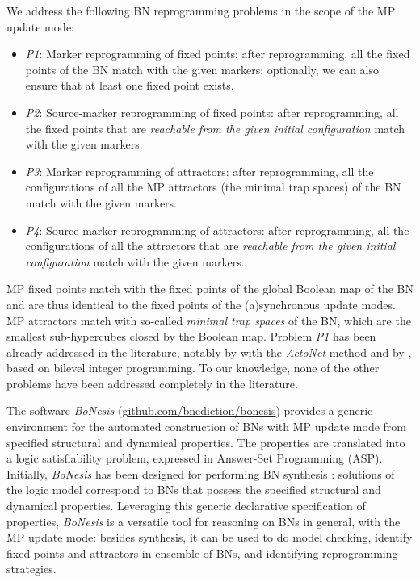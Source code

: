 \documentclass[PCJ,Unicode,screen,mode=plain]{cedram}
\begin{document}
We address the following BN reprogramming problems in the scope of the
MP update mode:

\begin{itemize}
\item
  \emph{P1}: Marker reprogramming of fixed points: after reprogramming,
  all the fixed points of the BN match with the given markers;
  optionally, we can also ensure that at least one fixed point exists.
\item
  \emph{P2}: Source-marker reprogramming of fixed points: after
  reprogramming, all the fixed points that are \emph{reachable from the
  given initial configuration} match with the given markers.
\item
  \emph{P3}: Marker reprogramming of attractors: after reprogramming,
  all the configurations of all the MP attractors (the minimal trap
  spaces) of the BN match with the given markers.
\item
  \emph{P4}: Source-marker reprogramming of attractors: after
  reprogramming, all the configurations of all the attractors that are
  \emph{reachable from the given initial configuration} match with the
  given markers.
\end{itemize}

MP fixed points match with the fixed points of the global Boolean map of
the BN and are thus identical to the fixed points of the (a)synchronous
update modes. MP attractors match with so-called \emph{minimal trap
spaces} of the BN, which are the smallest sub-hypercubes closed by the
Boolean map. Problem \emph{P1} has been already addressed in the
literature, notably by \citet{Biane2018} with the \emph{ActoNet} method
and by \citet{Moon22}, based on bilevel integer programming. To our
knowledge, none of the other problems have been addressed completely in
the literature.

The software \emph{BoNesis}
(\href{https://github.com/bnediction/bonesis}{github.com/bnediction/bonesis})
provides a generic environment for the automated construction of BNs
with MP update mode from specified structural and dynamical properties.
The properties are translated into a logic satisfiability problem,
expressed in Answer-Set Programming (ASP). Initially, \emph{BoNesis} has
been designed for performing BN synthesis \citep{bn-synthesis-ICTAI19}:
solutions of the logic model correspond to BNs that possess the
specified structural and dynamical properties. Leveraging this generic
declarative specification of properties, \emph{BoNesis} is a versatile
tool for reasoning on BNs in general, with the MP update mode: besides
synthesis, it can be used to do model checking, identify fixed points
and attractors in ensemble of BNs, and identifying reprogramming
strategies.
\end{document}
